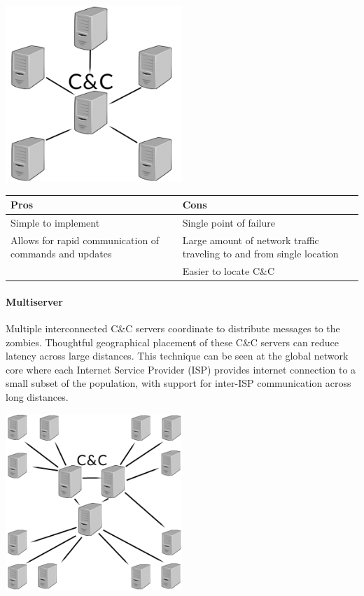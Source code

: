 \begin{center}
  \includegraphics[width=0.5\textwidth]{assets/startopo.png}
  \label{fig:star_topo_fig}
\end{center}

\begin{tabular}{p{8cm} | p{8cm}}
  \textbf{Pros} & \textbf{Cons} \\ \hline
  \textbullet{}Simple to implement                                    & \textbullet{}Single point of failure \\
  \textbullet{}Allows for rapid communication of commands and updates & \textbullet{}Large amount of network traffic traveling to and from single location\\
                                                                      & \textbullet{}Easier to locate C\&C
\end{tabular}

\paragraph{Multiserver \cite{topology}}
Multiple interconnected C\&C servers coordinate to distribute messages to the zombies.
Thoughtful geographical placement of these C\&C servers can reduce latency across
large distances.  This technique can be seen at the global network core where each
Internet Service Provider (ISP) provides internet connection to a small subset of the population, with support for
inter-ISP communication across long distances.

\begin{center}
  \includegraphics[width=0.5\textwidth]{assets/multiservertopo.png}
  \label{fig:mulitserver_topo_fig}
\end{center}

